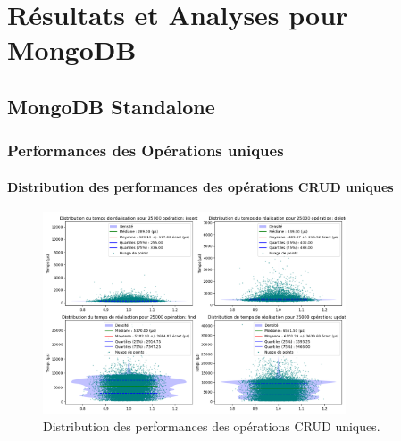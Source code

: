 \documentclass[12pt,a4paper]{report}
\begin{document}
\chapter{Résultats et Analyses pour MongoDB}

\section{MongoDB Standalone}

    \subsection{Performances des Opérations uniques}

        \subsubsection{Distribution des performances des opérations CRUD uniques}
        \begin{figure}[H]
            \centering
            \includegraphics[width=0.8\textwidth]{../plots/MongoDB/standalone/global_test_one.png}
            \caption{Distribution des performances des opérations CRUD uniques.}
            \label{fig:mongo_standalone_global_one}
        \end{figure}
      
\end{document}

